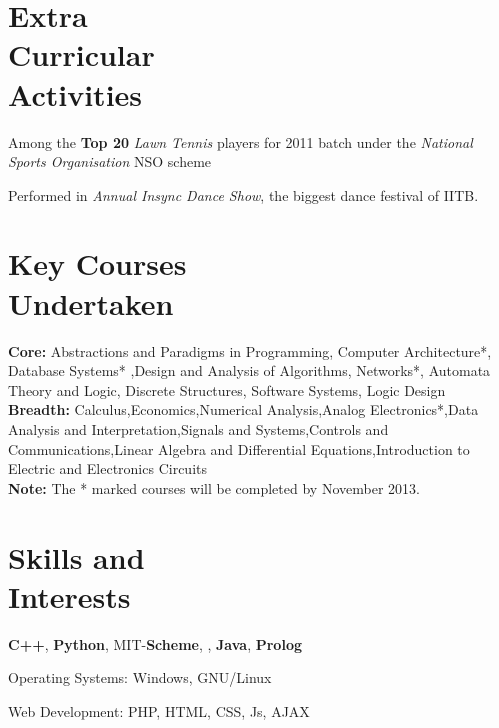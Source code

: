 \documentclass[margin,11pt]{resume}
\begin{document}
\begin{resume}
\section{\mysidestyle Extra \\ Curricular \\ Activities }
\begin{list2}
\item Among the \textbf{Top 20} \emph{Lawn Tennis} players for 2011 batch under the \emph{National Sports Organisation} NSO scheme
\item Performed in \emph{Annual Insync Dance Show}, the biggest dance festival of IITB.
\end{list2}
\section{\mysidestyle Key Courses\\Undertaken}

\textbf{Core:} 
Abstractions and Paradigms in Programming, Computer Architecture*, Database Systems* ,Design and Analysis of Algorithms, Networks*, Automata Theory and Logic, Discrete Structures, Software Systems, Logic Design\\
\textbf{Breadth:} 
Calculus,Economics,Numerical Analysis,Analog Electronics*,Data Analysis and Interpretation,Signals and Systems,Controls and Communications,Linear Algebra and Differential Equations,Introduction to Electric and Electronics Circuits \\
\textbf{Note:} The * marked courses will be completed by November 2013.

\section{\mysidestyle Skills and\\Interests} 
\begin{list2}
\item \textbf{C++}, \textbf{Python}, MIT-\textbf{Scheme}, \LaTeXe, \textbf{Java}, \textbf{Prolog}
\item Operating Systems: Windows, GNU/Linux
\item  Web Development: PHP, HTML, CSS, Js, AJAX
\end{list2}

\end{resume}
\end{document}
